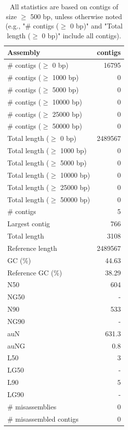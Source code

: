 \documentclass[12pt,a4paper]{article}
\begin{document}
\begin{table}[ht]
\begin{center}
\caption{All statistics are based on contigs of size $\geq$ 500 bp, unless otherwise noted (e.g., "\# contigs ($\geq$ 0 bp)" and "Total length ($\geq$ 0 bp)" include all contigs).}
\begin{tabular}{|l*{1}{|r}|}
\hline
Assembly & contigs \\ \hline
\# contigs ($\geq$ 0 bp) & 16795 \\ \hline
\# contigs ($\geq$ 1000 bp) & 0 \\ \hline
\# contigs ($\geq$ 5000 bp) & 0 \\ \hline
\# contigs ($\geq$ 10000 bp) & 0 \\ \hline
\# contigs ($\geq$ 25000 bp) & 0 \\ \hline
\# contigs ($\geq$ 50000 bp) & 0 \\ \hline
Total length ($\geq$ 0 bp) & 2489567 \\ \hline
Total length ($\geq$ 1000 bp) & 0 \\ \hline
Total length ($\geq$ 5000 bp) & 0 \\ \hline
Total length ($\geq$ 10000 bp) & 0 \\ \hline
Total length ($\geq$ 25000 bp) & 0 \\ \hline
Total length ($\geq$ 50000 bp) & 0 \\ \hline
\# contigs & 5 \\ \hline
Largest contig & 766 \\ \hline
Total length & 3108 \\ \hline
Reference length & 2489567 \\ \hline
GC (\%) & 44.63 \\ \hline
Reference GC (\%) & 38.29 \\ \hline
N50 & 604 \\ \hline
NG50 & - \\ \hline
N90 & 533 \\ \hline
NG90 & - \\ \hline
auN & 631.3 \\ \hline
auNG & 0.8 \\ \hline
L50 & 3 \\ \hline
LG50 & - \\ \hline
L90 & 5 \\ \hline
LG90 & - \\ \hline
\# misassemblies & 0 \\ \hline
\# misassembled contigs & 0 \\ \hline

\end{tabular}
\end{center}
\end{table}
\end{document}
